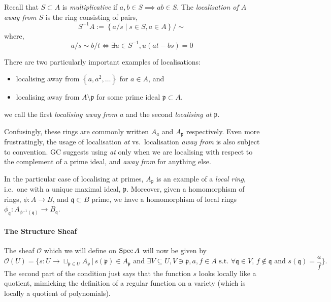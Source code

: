 \documentclass[000-main.tex]{subfiles}
\begin{document}
Recall that $S\subset A$ is \emph{multiplicative} if $a, b\in S \implies ab\in S$.
The \emph{localisation of $A$ away from $S$} is the ring consisting of pairs,
\begin{displaymath}
  S^{-1}A := \left\{ a/s \mid s\in S, a\in A \right\}/\sim
\end{displaymath}
where,
\begin{displaymath}
  a/s \sim b/t \iff
  \exists u\in S^{-1}, u(at - bs) = 0
\end{displaymath}

There are two particularly important examples of localisations:
\begin{itemize}
  \item localising away from $\left\{a, a^2, \ldots \right\}$ for $a\in A$, and
  \item localising away from $A\setminus\mathfrak{p}$ for some prime ideal $\mathfrak{p}\subset A$.
\end{itemize}
we call the first \emph{localising away from $a$} and the second \emph{localising at $\mathfrak{p}$}.

Confusingly, these rings are commonly written $A_a$ and $A_{\mathfrak{p}}$ respectively.
Even more frustratingly, the usage of localisation \emph{at} vs.\ localisation \emph{away from} is also subject to convention.
GC suggests using \emph{at} only when we are localising with respect to the complement of a prime ideal, and \emph{away from} for anything else.

In the particular case of localising at primes, $A_\mathfrak{p}$ is an example of a \emph{local ring}, i.e.\ one with a unique maximal ideal, $\mathfrak{p}$.
Moreover, given a homomorphism of rings, $\phi : A \to B$, and $\mathfrak{q}\subset B$ prime, we have a homomorphism of local rings $\phi_{\mathfrak{q}} : A_{\phi^{-1}(\mathfrak{q})} \to B_{\mathfrak{q}}$.

\paragraph{The Structure Sheaf}

The sheaf $\mathcal{O}$ which we will define on $\operatorname{Spec} A$ will now be given by
\[
  \mathcal{O}(U) = \lbrace s : U \to \sqcup_{\mathfrak{p} \in U} A_{\mathfrak{p}} \, | \, s(\mathfrak{p}) \in A_{\mathfrak{p}} \text{ and } \exists V \subseteq U, V \ni \mathfrak{p}, a, f \in A \text{ s.t. } \forall \mathfrak{q} \in V, \, f \notin \mathfrak{q} \text{ and } s(\mathfrak{q}) = \frac{a}{f} \rbrace.
\]
The second part of the condition just says that the function $s$ looks locally like a quotient, mimicking the definition of a regular function on a variety (which is locally a quotient of polynomials). 
\end{document}
